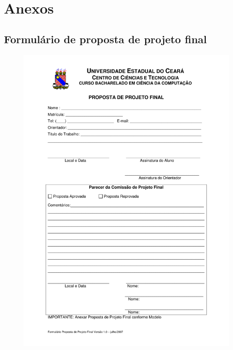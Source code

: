 \chapter{Anexos}
\clearpage
\section{Formulário de proposta de projeto final}
\label{anx:proposta}
\begin{figure}[htbp]
\centering
\includegraphics[scale=0.6]{requisitos/Formulario_Proposta_Projeto_Final.pdf}
\end{figure}

\clearpage
